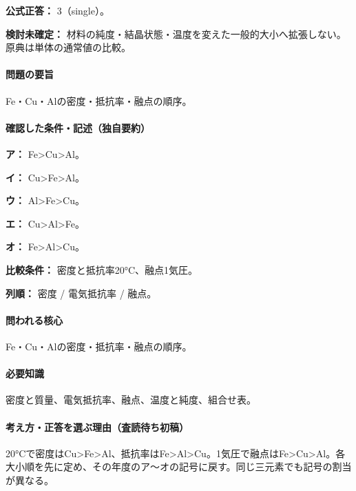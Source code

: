 \textbf{公式正答：} 3（single）。

\par\textbf{検討未確定：} 材料の純度・結晶状態・温度を変えた一般的大小へ拡張しない。原典は単体の通常値の比較。

\paragraph{問題の要旨} Fe・Cu・Alの密度・抵抗率・融点の順序。

\paragraph{確認した条件・記述（独自要約）}\mbox{}\par

\noindent\textbf{ア：} Fe>Cu>Al。\par

\noindent\textbf{イ：} Cu>Fe>Al。\par

\noindent\textbf{ウ：} Al>Fe>Cu。\par

\noindent\textbf{エ：} Cu>Al>Fe。\par

\noindent\textbf{オ：} Fe>Al>Cu。\par

\noindent\textbf{比較条件：} 密度と抵抗率20°C、融点1気圧。\par

\noindent\textbf{列順：} 密度 / 電気抵抗率 / 融点。\par

\paragraph{問われる核心} Fe・Cu・Alの密度・抵抗率・融点の順序。

\paragraph{必要知識} 密度と質量、電気抵抗率、融点、温度と純度、組合せ表。

\paragraph{考え方・正答を選ぶ理由（査読待ち初稿）} 20°Cで密度はCu>Fe>Al、抵抗率はFe>Al>Cu。1気圧で融点はFe>Cu>Al。各大小順を先に定め、その年度のア〜オの記号に戻す。同じ三元素でも記号の割当が異なる。

